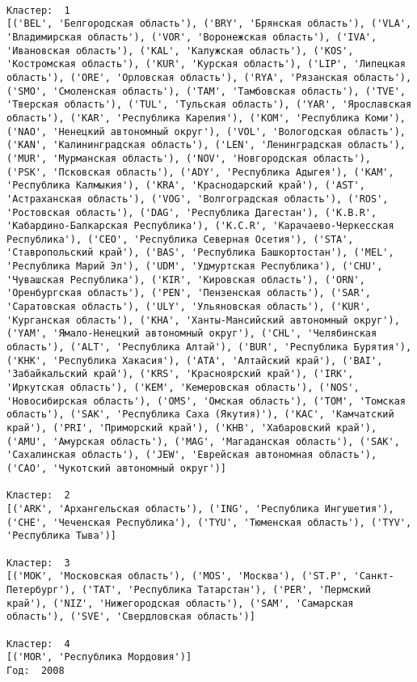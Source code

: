 \documentclass[11pt]{article}
\begin{document}
    \begin{Verbatim}[commandchars=\\\{\}]

Кластер:  1
[('BEL', 'Белгородская область'), ('BRY', 'Брянская область'), ('VLA', 'Владимирская область'), ('VOR', 'Воронежская область'), ('IVA', 'Ивановская область'), ('KAL', 'Калужская область'), ('KOS', 'Костромская область'), ('KUR', 'Курская область'), ('LIP', 'Липецкая область'), ('ORE', 'Орловская область'), ('RYA', 'Рязанская область'), ('SMO', 'Смоленская область'), ('TAM', 'Тамбовская область'), ('TVE', 'Тверская область'), ('TUL', 'Тульская область'), ('YAR', 'Ярославская область'), ('KAR', 'Республика Карелия'), ('KOM', 'Республика Коми'), ('NAO', 'Ненецкий автономный округ'), ('VOL', 'Вологодская область'), ('KAN', 'Калинингpадская область'), ('LEN', 'Ленинградская область'), ('MUR', 'Мурманская область'), ('NOV', 'Новгородская область'), ('PSK', 'Псковская область'), ('ADY', 'Республика Адыгея'), ('KAM', 'Республика Калмыкия'), ('KRA', 'Краснодарский край'), ('AST', 'Астраханская область'), ('VOG', 'Волгоградская область'), ('ROS', 'Ростовская область'), ('DAG', 'Республика Дагестан'), ('K.B.R', 'Кабардино-Балкарская Республика'), ('K.C.R', 'Карачаево-Черкесская Республика'), ('CEO', 'Республика Северная Осетия'), ('STA', 'Ставропольский край'), ('BAS', 'Республика Башкортостан'), ('MEL', 'Республика Марий Эл'), ('UDM', 'Удмуртская Республика'), ('CHU', 'Чувашская Республика'), ('KIR', 'Кировская область'), ('ORN', 'Оренбургская область'), ('PEN', 'Пензенская область'), ('SAR', 'Саратовская область'), ('ULY', 'Ульяновская область'), ('KUR', 'Курганская область'), ('KHA', 'Ханты-Мансийский автономный округ'), ('YAM', 'Ямало-Ненецкий автономный округ'), ('CHL', 'Челябинская область'), ('ALT', 'Республика Алтай'), ('BUR', 'Республика Бурятия'), ('KHK', 'Республика Хакасия'), ('ATA', 'Алтайский край'), ('BAI', 'Забайкальский край'), ('KRS', 'Красноярский край'), ('IRK', 'Иркутская область'), ('KEM', 'Кемеровская область'), ('NOS', 'Новосибирская область'), ('OMS', 'Омская область'), ('TOM', 'Томская область'), ('SAK', 'Республика Саха (Якутия)'), ('KAC', 'Камчатский край'), ('PRI', 'Приморский край'), ('KHB', 'Хабаровский край'), ('AMU', 'Амурская область'), ('MAG', 'Магаданская область'), ('SAK', 'Сахалинская область'), ('JEW', 'Еврейская автономная область'), ('CAO', 'Чукотский автономный округ')]

Кластер:  2
[('ARK', 'Архангельская область'), ('ING', 'Республика Ингушетия'), ('CHE', 'Чеченская Республика'), ('TYU', 'Тюменская область'), ('TYV', 'Республика Тыва')]

Кластер:  3
[('MOK', 'Московская область'), ('MOS', 'Москва'), ('ST.P', 'Санкт-Петербург'), ('TAT', 'Республика Татарстан'), ('PER', 'Пермский край'), ('NIZ', 'Нижегородская область'), ('SAM', 'Самарская область'), ('SVE', 'Свердловская область')]

Кластер:  4
[('MOR', 'Республика Мордовия')]
Год:  2008

    \end{Verbatim}
\end{document}
